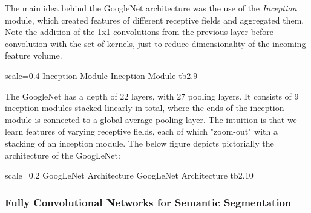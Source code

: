 The main idea behind the GoogleNet architecture was the use of the \emph{Inception} module, which created features of different receptive fields and aggregated them. Note the addition of the 1x1 convolutions from the previous layer before convolution with the set of kernels, just to reduce dimensionality of the incoming feature volume. 

{scale=0.4}%
{Inception Module}%
{Inception Module}%
{tb2.9} %

The GoogleNet has a depth of 22 layers, with 27 pooling layers. It consists of 9 inception modules stacked linearly in total, where the ends of the inception module is connected to a global average pooling layer. The intuition is that we learn features of varying receptive fields, each of which "zoom-out" with a stacking of an inception module. The below figure depicts pictorially the architecture of the GoogLeNet:

{scale=0.2}%
{GoogLeNet Architecture}%
{GoogLeNet Architecture}%
{tb2.10} %

\subsubsection{Fully Convolutional Networks for Semantic Segmentation}

















 



















 



















 



 





